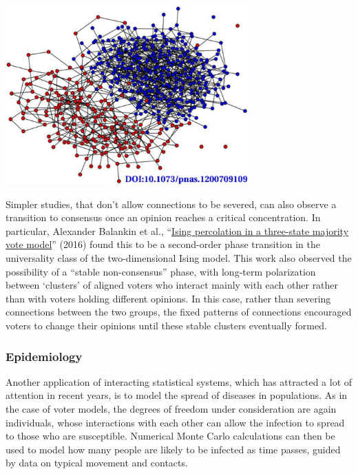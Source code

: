 \begin{center}\includegraphics[width=0.7\textwidth]{figs/unit10_voter.pdf}\end{center}

Simpler studies, that don't allow connections to be severed, can also observe a transition to consensus once an opinion reaches a critical concentration.
In particular, Alexander Balankin et al., ``\href{https://doi.org/10.1016/j.physleta.2016.12.001}{Ising percolation in a three-state majority vote model}'' (2016) found this to be a second-order phase transition in the universality class of the two-dimensional Ising model.
This work also observed the possibility of a ``stable non-consensus'' phase, with long-term polarization between `clusters' of aligned voters who interact mainly with each other rather than with voters holding different opinions.
In this case, rather than severing connections between the two groups, the fixed patterns of connections encouraged voters to change their opinions until these stable clusters eventually formed.

\subsubsection*{Epidemiology}
Another application of interacting statistical systems, which has attracted a lot of attention in recent years, is to model the spread of diseases in populations.
As in the case of voter models, the degrees of freedom under consideration are again individuals, whose interactions with each other can allow the infection to spread to those who are susceptible.
Numerical Monte Carlo calculations can then be used to model how many people are likely to be infected as time passes, guided by data on typical movement and contacts.

